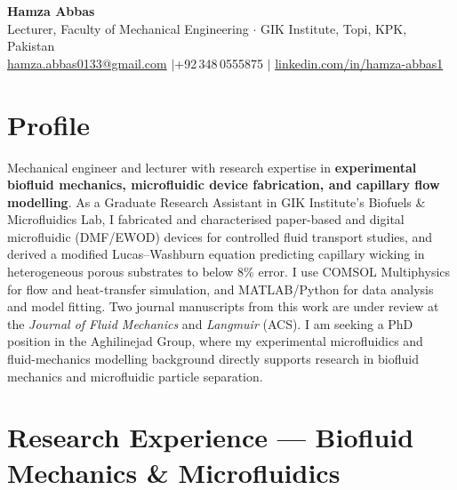 \documentclass[11pt,a4paper]{article}
\begin{document}

\begin{center}
  {\LARGE\bfseries\color{accent} Hamza Abbas}\\[4pt]
  Lecturer, Faculty of Mechanical Engineering $\cdot$ GIK Institute, Topi, KPK,
  Pakistan\\[3pt]
  \href{mailto:hamza.abbas0133@gmail.com}{hamza.abbas0133@gmail.com}
  \quad$|$\quad +92\,348\,0555875
  \quad$|$\quad
  \href{https://linkedin.com/in/hamza-abbas1}{linkedin.com/in/hamza-abbas1}
\end{center}

\section{Profile}

Mechanical engineer and lecturer with research expertise in
\textbf{experimental biofluid mechanics, microfluidic device fabrication, and
capillary flow modelling}. As a Graduate Research Assistant in GIK Institute's
Biofuels \& Microfluidics Lab, I fabricated and characterised paper-based and
digital microfluidic (DMF/EWOD) devices for controlled fluid transport studies,
and derived a modified Lucas--Washburn equation predicting capillary wicking in
heterogeneous porous substrates to below 8\% error. I use COMSOL Multiphysics for
flow and heat-transfer simulation, and MATLAB/Python for data analysis and model
fitting. Two journal manuscripts from this work are under review at the
\textit{Journal of Fluid Mechanics} and \textit{Langmuir} (ACS). I am seeking a
PhD position in the Aghilinejad Group, where my experimental microfluidics and
fluid-mechanics modelling background directly supports research in biofluid
mechanics and microfluidic particle separation.

\section{Research Experience — Biofluid Mechanics \& Microfluidics}
\end{document}

